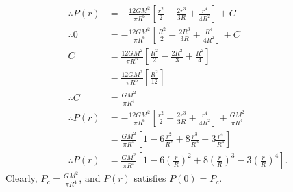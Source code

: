 \documentclass[a4paper,11pt]{article}
\newcommand{\ds}{\displaystyle}
\begin{document}
{{\begin{enumerate}[leftmargin=*]
\begin{enumerate}[label=\alph*)]
\begin{align*}
					\therefore P(r) & = -\frac{12GM^2}{\pi R^6} \left[\frac{r^2}{2} - \frac{2r^3}{3R} + \frac{r^4}{4R^2}\right] + C \\
					\therefore 0 & = -\frac{12GM^2}{\pi R^6} \left[\frac{R^2}{2} - \frac{2R^3}{3R} + \frac{R^4}{4R^2}\right] + C \\
					C & = \frac{12GM^2}{\pi R^6} \left[\frac{R^2}{2} - \frac{2R^2}{3} + \frac{R^2}{4}\right] \\
					  & = \frac{12GM^2}{\pi R^6} \left[\frac{R^2}{12}\right] \\
					\therefore C & = \frac{GM^2}{\pi R^4} \\
					\therefore P(r) & = -\frac{12GM^2}{\pi R^6} \left[\frac{r^2}{2} - \frac{2r^3}{3R} + \frac{r^4}{4R^2}\right] + \frac{GM^2}{\pi R^4} \\
									& = \frac{GM^2}{\pi R^4} \left[1 - 6\frac{r^2}{R^2} + 8\frac{r^3}{R^3} - 3\frac{r^4}{R^4}\right] \\
					\therefore P(r) & = \frac{GM^2}{\pi R^4} \left[1 - 6\left(\frac{r}{R}\right)^2 + 8\left(\frac{r}{R}\right)^3 - 3\left(\frac{r}{R}\right)^4\right].
				\end{align*}
				Clearly, $\ds{P_c = \frac{GM^2}{\pi R^4}}$, and $\ds{P(r)}$ satisfies $\ds{P(0) = P_c}$.



\end{enumerate}
\end{enumerate}}}
\end{document}
